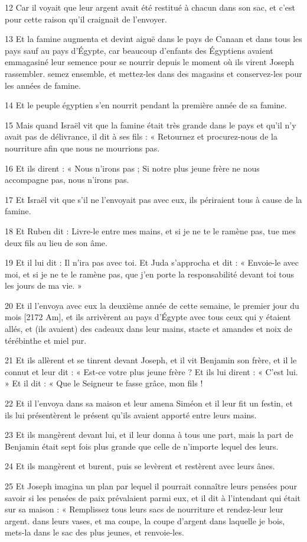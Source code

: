 \par 12 Car il voyait que leur argent avait été restitué à chacun dans son sac, et c'est pour cette raison qu'il craignait de l'envoyer.
\par 13 Et la famine augmenta et devint aiguë dans le pays de Canaan et dans tous les pays sauf au pays d'Égypte, car beaucoup d'enfants des Égyptiens avaient emmagasiné leur semence pour se nourrir depuis le moment où ils virent Joseph rassembler. semez ensemble, et mettez-les dans des magasins et conservez-les pour les années de famine.
\par 14 Et le peuple égyptien s'en nourrit pendant la première année de sa famine.
\par 15 Mais quand Israël vit que la famine était très grande dans le pays et qu'il n'y avait pas de délivrance, il dit à ses fils : « Retournez et procurez-nous de la nourriture afin que nous ne mourrions pas.
\par 16 Et ils dirent : « Nous n'irons pas ; Si notre plus jeune frère ne nous accompagne pas, nous n'irons pas.
\par 17 Et Israël vit que s'il ne l'envoyait pas avec eux, ils périraient tous à cause de la famine.
\par 18 Et Ruben dit : Livre-le entre mes mains, et si je ne te le ramène pas, tue mes deux fils au lieu de son âme.
\par 19 Et il lui dit : Il n'ira pas avec toi. Et Juda s'approcha et dit : « Envoie-le avec moi, et si je ne te le ramène pas, que j'en porte la responsabilité devant toi tous les jours de ma vie. »
\par 20 Et il l'envoya avec eux la deuxième année de cette semaine, le premier jour du mois [2172 Am], et ils arrivèrent au pays d'Égypte avec tous ceux qui y étaient allés, et (ils avaient) des cadeaux dans leur mains, stacte et amandes et noix de térébinthe et miel pur.
\par 21 Et ils allèrent et se tinrent devant Joseph, et il vit Benjamin son frère, et il le connut et leur dit : « Est-ce votre plus jeune frère ? Et ils lui dirent : « C'est lui. » Et il dit : « Que le Seigneur te fasse grâce, mon fils !
\par 22 Et il l'envoya dans sa maison et leur amena Siméon et il leur fit un festin, et ils lui présentèrent le présent qu'ils avaient apporté entre leurs mains.
\par 23 Et ils mangèrent devant lui, et il leur donna à tous une part, mais la part de Benjamin était sept fois plus grande que celle de n'importe lequel des leurs.
\par 24 Et ils mangèrent et burent, puis se levèrent et restèrent avec leurs ânes.
\par 25 Et Joseph imagina un plan par lequel il pourrait connaître leurs pensées pour savoir si les pensées de paix prévalaient parmi eux, et il dit à l'intendant qui était sur sa maison : « Remplissez tous leurs sacs de nourriture et rendez-leur leur argent. dans leurs vases, et ma coupe, la coupe d'argent dans laquelle je bois, mets-la dans le sac des plus jeunes, et renvoie-les.

